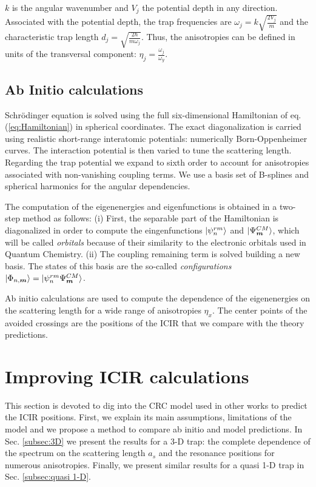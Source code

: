 \documentclass[aps,pre,twocolumn,superscriptaddress,showpacs]{revtex4-1}
\newcommand{\bfeq}[1]{{\boldsymbol{#1}}}
\begin{document}
$k$ is the angular wavenumber and $V_j$ the potential depth in any direction. Associated with the potential depth, the trap frequencies are $\omega_j = k\sqrt{\frac{2V_j}{m}}$ and the
 characteristic trap length $d_j = \sqrt{\frac{2\hbar}{m\omega_j}}$. Thus, the anisotropies can be defined in units of the transversal component: $\eta_j = \frac{\omega_j}{\omega_y}$.
	
	
\subsection{Ab Initio calculations} \label{subsec:Ab_initio}
Schrödinger equation is solved using the full six-dimensional Hamiltonian of eq.(\ref{eq:Hamiltonian}) in spherical coordinates. The exact 	diagonalization is carried using realistic 
short-range interatomic potentials: numerically Born-Oppenheimer curves. The interaction potential is then varied to tune the scattering length. Regarding the trap potential we 
expand to sixth order to account for anisotropies associated with non-vanishing coupling terms.  We use a basis set of B-splines and spherical harmonics for the angular dependencies.
\cite{PhysRevA.84.062710}
		
The computation of the eigenenergies and eigenfunctions is obtained in a two-step method as follows: (i) First, the separable part of the Hamiltonian is diagonalized in order to compute
the eingenfunctions $\ket{\psi^{rm}_n}$ and $\ket{\Psi^{CM}_{\bfeq{m}}}$, which will be called \textit{orbitals} because of their similarity to the electronic orbitals used in Quantum Chemistry.
(ii) The coupling remaining term is solved building a new basis. The states of this basis are the so-called \textit{configurations} $\ket{\Phi_{n, \bfeq{m}}} = \ket{\psi^{rm}_n \Psi^{CM}_{\bfeq{m}}}$.  
		
Ab initio calculations are used to compute the dependence of the eigenenergies on the scattering length for a wide range of anisotropies $\eta_x$. The center points of the avoided crossings 
are the positions of the ICIR that we compare with the theory predictions.
\section{Improving ICIR calculations}  \label{sec:theory}
This section is devoted to dig into the CRC model used in other works to predict the ICIR positions. First, we explain its main assumptions, limitations of the model and we propose a
method to compare ab initio and model predictions. In Sec. \ref{subsec:3D} we present the results for a 3-D trap: the complete dependence of the spectrum on the scattering length $a_s$ and
the resonance positions for numerous anisotropies. Finally, we present similar results for a quasi 1-D trap in Sec. \ref{subsec:quasi 1-D}.
	
\end{document}

